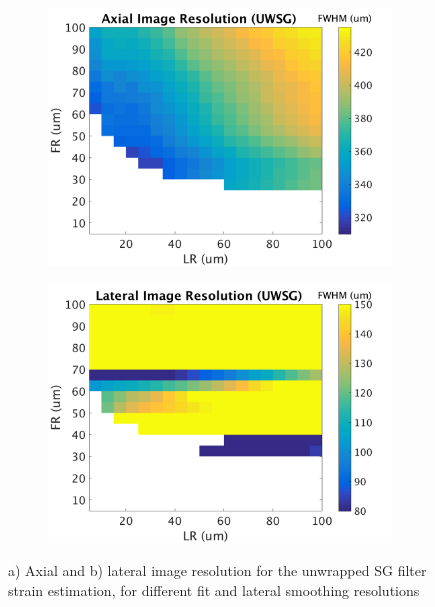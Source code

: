 \begin{figure}[h!]
	\centering
	\begin{subfigure}{0.49\textwidth}
		\centering
		\includegraphics[width=\textwidth]{appendix_figs/uwsg_axial_imageres.png}
	\end{subfigure}
	\begin{subfigure}{0.49\textwidth}
		\centering
		\includegraphics[width=\textwidth]{appendix_figs/uwsg_lateral_imageres.png}
	\end{subfigure}
	\caption{a) Axial and b) lateral image resolution for the unwrapped SG filter strain estimation, for different fit and lateral smoothing resolutions}
	\label{uwsg_imageres}
\end{figure}

